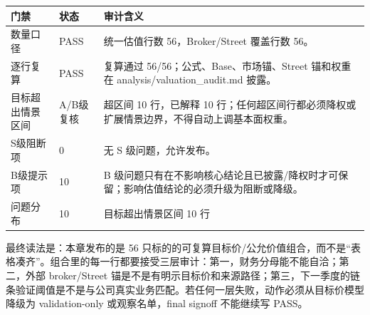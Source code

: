 \begin{exhibitbox}[估值质量门禁摘要]
\scriptsize
\begin{tabularx}{\linewidth}{L{3.0cm}L{2.2cm}X}
\toprule
\textbf{门禁} & \textbf{状态} & \textbf{审计含义}\\
\midrule
数量口径 & PASS & 统一估值行数 56，Broker/Street 覆盖行数 56。\\
逐行复算 & PASS & 复算通过 56/56；公式、Base、市场锚、Street 锚和权重在 analysis/valuation\_audit.md 披露。\\
目标超出情景区间 & A/B级复核 & 超区间 10 行，已解释 10 行；任何超区间行都必须降权或扩展情景边界，不得自动上调基本面权重。\\
S级阻断项 & 0 & 无 S 级问题，允许发布。\\
B级提示项 & 10 & B 级问题只有在不影响核心结论且已披露/降权时才可保留；影响估值结论的必须升级为阻断或降级。\\
问题分布 & 10 & 目标超出情景区间 10 行\\
\bottomrule
\end{tabularx}
\end{exhibitbox}

最终读法是：本章发布的是 56 只标的的可复算目标价/公允价值组合，而不是“表格凑齐”。组合里的每一行都要接受三层审计：第一，财务分母能不能自洽；第二，外部 broker/Street 锚是不是有明示目标价和来源路径；第三，下一季度的链条验证阈值是不是与公司真实业务匹配。若任何一层失败，动作必须从目标价模型降级为 validation-only 或观察名单，final signoff 不能继续写 PASS。
